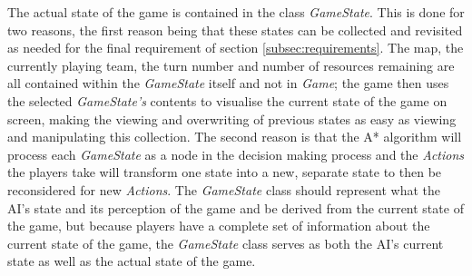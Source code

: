 \documentclass[11pt, a4paper]{report}
\begin{document}
The actual state of the game is contained in the class \emph{GameState}. This is done for two reasons, the first reason being that these states can be collected and revisited as needed for the final requirement of section \ref{subsec:requirements}. The map, the currently playing team, the turn number and number of resources remaining are all contained within the \emph{GameState} itself and not in \emph{Game}; the game then uses the selected \emph{GameState's} contents to visualise the current state of the game on screen, making the viewing and overwriting of previous states as easy as viewing and manipulating this collection. The second reason is that the A* algorithm will process each \emph{GameState} as a node in the decision making process and the \emph{Actions} the players take will transform one state into a new, separate state to then be reconsidered for new \emph{Actions}. The \emph{GameState} class should represent what the AI's state and its perception of the game and be derived from the current state of the game, but because players have a complete set of information about the current state of the game, the \emph{GameState} class serves as both the AI's current state as well as the actual state of the game.
\end{document}
